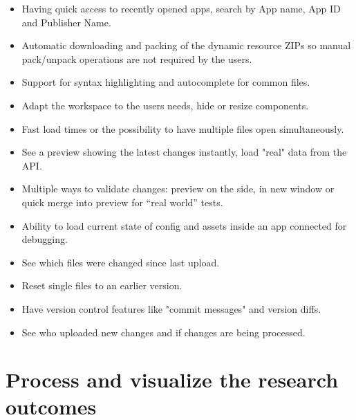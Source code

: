 \begin{description}[nosep]
  \item[App Selection] \leavevmode
  \begin{itemize}
    \item Having quick access to recently opened apps, search by App name, App ID and Publisher Name.
  \end{itemize}
  \item[App Editing] \leavevmode
  \begin{itemize}[itemsep=0mm]
    \item Automatic downloading and packing of the dynamic resource ZIPs so manual pack/unpack operations are not required by the users.
    \item Support for syntax highlighting and autocomplete for common files.
    \item Adapt the workspace to the users needs, hide or resize components.
    \item Fast load times or the possibility to have multiple files open simultaneously.
  \end{itemize}
  \item[App Preview]\leavevmode
   \begin{itemize}[itemsep=0mm]
    \item See a preview showing the latest changes instantly, load "real" data from the API.
    \item Multiple ways to validate changes: preview on the side, in new window or quick merge into preview for ``real world'' tests.
    \item Ability to load current state of config and assets inside an app connected for debugging.
  \end{itemize}
  \item[Dynamic Resource Change Management] \leavevmode
  \begin{itemize}[itemsep=0mm]
    \item See which files were changed since last upload.
    \item Reset single files to an earlier version.
    \item Have version control features like "commit messages" and version diffs.
    \item See who uploaded new changes and if changes are being processed.
  \end{itemize}
\end{description}


\section{Process and visualize the research outcomes}

